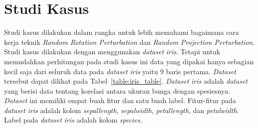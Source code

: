 \section{Studi Kasus}
\label{sec:studi-kasus}

Studi kasus dilakukan dalam rangka untuk lebih memahami bagaimana cara kerja teknik \textit{Random Rotation Perturbation} dan \textit{Random Projection Perturbation}. Studi kasus dilakukan dengan menggunakan \textit{dataset} \textit{iris}. Tetapi untuk memudahkan perhitungan pada studi kasus ini data yang dipakai hanya sebagian kecil saja dari seluruh data pada \textit{dataset} \textit{iris} yaitu 9 baris pertama. \textit{Dataset} tersebut dapat dilihat pada Tabel~\ref{table:iris_table}. \textit{Dataset} \textit{iris} adalah \textit{dataset} yang berisi data tentang korelasi antara ukuran bunga dengan spesiesnya. \textit{Dataset} ini memiliki empat buah fitur dan satu buah label. Fitur-fitur pada \textit{dataset} \textit{iris} adalah kolom \textit{sepal\textunderscore length}, \textit{sepal\textunderscore width}, \textit{petal\textunderscore length}, dan \textit{petal\textunderscore width}. Label pada \textit{dataset} \textit{iris} adalah kolom \textit{species}.

